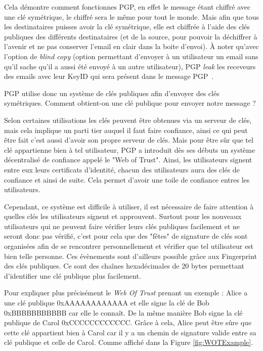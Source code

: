 Cela démontre comment fonctionnes PGP, en effet le message étant chiffré avec une clé symétrique, le chiffré sera le même pour tout le monde. Mais afin que tous les destinataires puisses avoir la clé symétrique, elle est chiffrée à l'aide des clés publiques des différents destinataires (et de la source, pour pouvoir la déchiffrer à l'avenir et ne pas conserver l'email en clair dans la boite d'envoi). À noter qu'avec l'option de \textit{blind copy} (option permettant d'envoyer à un utilisateur un email sans qu'il sache qu'il a aussi été envoyé à un autre utilisateur), PGP \textit{leak} les receveurs des emails avec leur KeyID qui sera présent dans le message PGP~\cite{BccPrivacy}.

PGP utilise donc un système de clés publiques afin d'envoyer des clés symétriques. Comment obtient-on une clé publique pour envoyer notre message ?

Selon certaines utilisations les clés peuvent être obtenues via un serveur de clés, mais cela implique un parti tier auquel il faut faire confiance, ainsi ce qui peut être fait c'est aussi d'avoir son propre serveur de clés. Mais pour être sûr que tel clé appartienne bien à tel utilisateur, PGP a introduit dès ses débuts un système décentralisé de confiance appelé le "Web of Trust". Ainsi, les utilisateurs signent entre eux leurs certificats d'identité, chacun des utilisateurs aura des clés de confiance et ainsi de suite. Cela permet d'avoir une toile de confiance entres les utilisateurs.

Cependant, ce système est difficile à utiliser, il est nécessaire de faire attention à quelles clés les utilisateurs signent et approuvent. Surtout pour les nouveaux utilisateurs qui ne peuvent faire vérifier leurs clés publiques facilement et ne seront donc pas vérifié, c'est pour cela que des "fêtes" de signature de clés sont organisées afin de se rencontrer personnellement et vérifier que tel utilisateur est bien telle personne. Ces évènements sont d'ailleurs possible grâce aux Fingerprint des clés publiques. Ce sont des chaînes hexadécimales de 20 bytes permettant d'identifier une clé publique plus facilement.

Pour expliquer plus précisément le \textit{Web Of Trust} prenant un exemple : Alice a une clé publique 0xAAAAAAAAAAAA et elle signe la clé de Bob 0xBBBBBBBBBBB car elle le connaît. De la même manière Bob signe la clé publique de Carol 0xCCCCCCCCCCCC. Grâce à cela, Alice peut être sûre que cette clé appartient bien à Carol car il y a un chemin de signature valide entre sa clé publique et celle de Carol. Comme affiché dans la Figure \ref{fig:WOTExample}.

